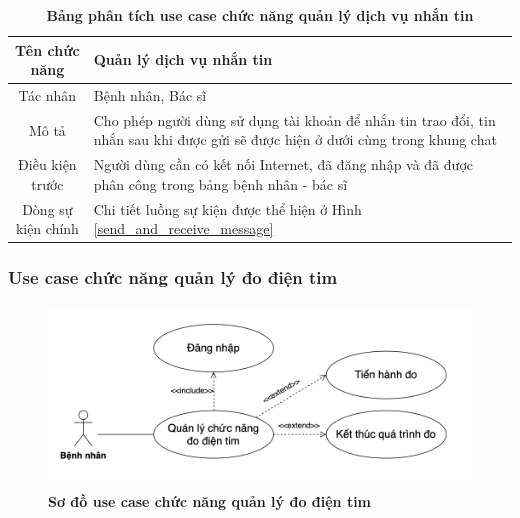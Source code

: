   \begin{table}[H]
    \caption{\bfseries \fontsize{12pt}{0pt}\selectfont Bảng phân tích use case chức năng quản lý dịch vụ nhắn tin}
    \centering
    \begin{tabularx}{0.9\textwidth}{|c|X|}
      \hline
      \textbf{Tên chức năng} & \textbf{Quản lý dịch vụ nhắn tin} \\
      \hline
      Tác nhân & Bệnh nhân, Bác sĩ \\
      \hline
      Mô tả & Cho phép người dùng sử dụng tài khoản để nhắn tin trao đổi, tin nhắn sau khi được gửi sẽ được
      hiện ở dưới cùng trong khung chat \\
      \hline
      Điều kiện trước & Người dùng cần có kết nối Internet, đã đăng nhập và đã được phân công trong bảng bệnh nhân - bác sĩ \\
      \hline
      Dòng sự kiện chính & 
        Chi tiết luồng sự kiện được thể hiện ở Hình \ref{send_and_receive_message}\\
      \hline
    \end{tabularx}
  \end{table}

\subsubsection{Use case chức năng quản lý đo điện tim}
  \begin{figure}[H]
    \centering
    \includegraphics[width=12cm,height=4.8cm]{Images/use_case/use_case_measure_ecg.png}
    \caption[Sơ đồ use case chức năng quản lý đo điện tim]{\bfseries \fontsize{12pt}{0pt}
    \selectfont Sơ đồ use case chức năng quản lý đo điện tim}
    \label{use_case_measure_ecg} %
  \end{figure}

